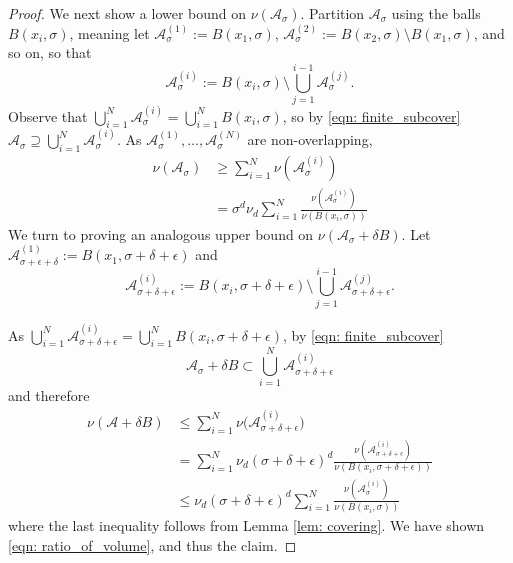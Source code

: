 \documentclass{article}
\newcommand{\1}{\mathbf{1}}
\newcommand{\Aset}{\mathcal{A}}
\newcommand{\Asig}{\Aset_{\sigma}}
\theoremstyle{aldenthm}
\theoremstyle{aldenrmrk}
\begin{document}
\begin{proof}
	We next show a lower bound on $\nu(\Asig)$. Partition $\Asig$ using the balls $B(x_i,\sigma)$, meaning let $\Aset_{\sigma}^{(1)} := B(x_1,\sigma)$, $\Aset_{\sigma}^{(2)} := B(x_2,\sigma) \setminus B(x_1,\sigma)$, and so on, so that
	\begin{equation*}
	\Aset_{\sigma}^{(i)} := B(x_i,\sigma) \setminus \bigcup_{j = 1}^{i - 1} \Aset_{\sigma}^{(j)}. \tag{$i = 1,\ldots,N$}
	\end{equation*}
	Observe that $\bigcup_{i = 1}^{N} \Asig^{(i)} = \bigcup_{i = 1}^{N} B(x_i,\sigma)$, so by \eqref{eqn: finite_subcover} $\Asig \supseteq \bigcup_{i = 1}^{N} \Asig^{(i)}$. As $\Asig^{(1)},\ldots, \Asig^{(N)}$ are non-overlapping,
	\begin{align*}
	\nu(\Asig) & \geq \sum_{i = 1}^{N} \nu(\Asig^{(i)}) \\
	& = \sigma^d \nu_d \sum_{i = 1}^{N}  \frac{\nu(\Asig^{(i)})}{\nu(B(x_i,\sigma))}
	\end{align*}
	We turn to proving an analogous upper bound on $\nu(\Asig + \delta B)$. Let $\Aset_{\sigma + \epsilon + \delta}^{(1)} := B(x_1,\sigma + \delta + \epsilon)$ and
	\begin{equation*}
	\Aset_{\sigma + \delta + \epsilon}^{(i)} := B(x_i,\sigma + \delta + \epsilon) \setminus \bigcup_{j = 1}^{i - 1} \Aset_{\sigma + \delta + \epsilon}^{(j)}. \tag{$i = 2,\ldots,N$}
	\end{equation*}
	
	As $\bigcup_{i = 1}^{N} \Aset_{\sigma + \delta + \epsilon}^{(i)} = \bigcup_{i = 1}^{N} B(x_i,\sigma + \delta + \epsilon)$, by \eqref{eqn: finite_subcover}
	\begin{equation*}
	\Aset_{\sigma} + \delta B \subset \bigcup_{i =1}^{N} \Aset_{\sigma + \delta + \epsilon}^{(i)}
	\end{equation*}
	and therefore
	\begin{align*}
	\nu(\Aset + \delta B) & \leq \sum_{i = 1}^{N} \nu\bigl(\Aset_{\sigma + \delta + \epsilon}^{(i)}\bigr) \\
	& = \sum_{i = 1}^{N} \nu_d (\sigma + \delta + \epsilon)^d \frac{\nu(\Aset_{\sigma + \delta + \epsilon}^{(i)})}{\nu(B(x_i, \sigma + \delta + \epsilon))} \\
	& \leq \nu_d (\sigma + \delta + \epsilon)^d \sum_{i = 1}^{N} \frac{\nu(\Asig^{(i)})}{\nu(B(x_i,\sigma))}
	\end{align*}
	where the last inequality follows from Lemma \ref{lem: covering}. We have shown \eqref{eqn: ratio_of_volume}, and thus the claim.
\end{proof}
\end{document}
